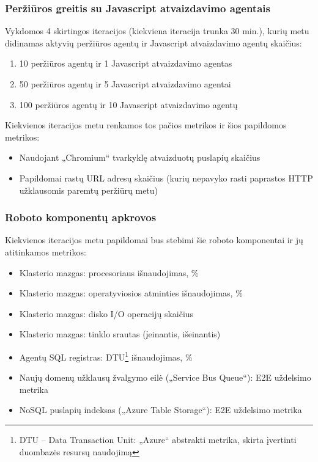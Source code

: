\subsubsection{Peržiūros greitis su Javascript atvaizdavimo agentais}

Vykdomos 4 skirtingos iteracijos (kiekviena iteracija trunka 30 min.), kurių metu didinamas aktyvių peržiūros agentų ir Javascript atvaizdavimo agentų skaičius:

\begin{enumerate}
    \item 10 peržiūros agentų ir 1 Javascript atvaizdavimo agentas
    \item 50 peržiūros agentų ir 5 Javascript atvaizdavimo agentai
    \item 100 peržiūros agentų ir 10 Javascript atvaizdavimo agentų
\end{enumerate}

Kiekvienos iteracijos metu renkamos tos pačios metrikos ir šios papildomos metrikos:

\begin{itemize}
    \item Naudojant „Chromium“ tvarkyklę atvaizduotų puslapių skaičius
    \item Papildomai rastų URL adresų skaičius (kurių nepavyko rasti paprastos HTTP užklausomis paremtų peržiūrų metu)
\end{itemize}

\subsubsection{Roboto komponentų apkrovos}

Kiekvienos iteracijos metu papildomai bus stebimi šie roboto komponentai ir jų atitinkamos metrikos:

\begin{itemize}
    \item Klasterio mazgas: procesoriaus išnaudojimas, \%
    \item Klasterio mazgas: operatyviosios atminties išnaudojimas, \%
    \item Klasterio mazgas: disko I/O operacijų skaičius
    \item Klasterio mazgas: tinklo srautas (įeinantis, išeinantis)
    \item Agentų SQL registras: DTU\footnote{DTU -- Data Transaction Unit: „Azure“ abstrakti metrika, skirta įvertinti duombazės resursų naudojimą} išnaudojimas, \%
    \item Naujų domenų užklausų žvalgymo eilė („Service Bus Queue“): E2E uždelsimo metrika
    \item NoSQL puslapių indeksas („Azure Table Storage“): E2E uždelsimo metrika
\end{itemize}

